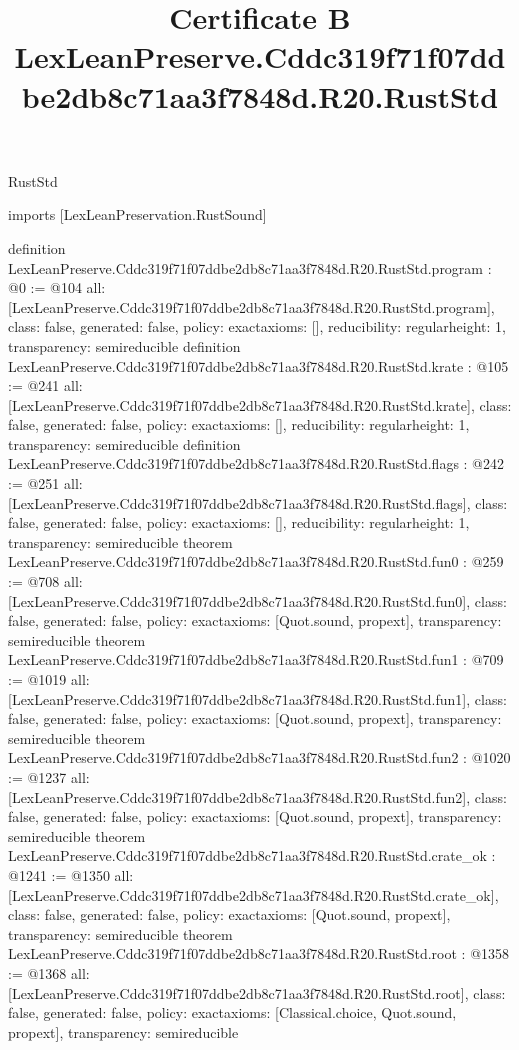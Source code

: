 \begin{lexlean}{RustStd}
\title{Certificate B LexLeanPreserve.Cddc319f71f07ddbe2db8c71aa3f7848d.R20.RustStd}
\begin{coremodule}
imports [LexLeanPreservation.RustSound]

definition LexLeanPreserve.Cddc319f71f07ddbe2db8c71aa3f7848d.R20.RustStd.program : @0 := @104 {
  all: [LexLeanPreserve.Cddc319f71f07ddbe2db8c71aa3f7848d.R20.RustStd.program],
  class: false,
  generated: false,
  policy: exact{axioms: []},
  reducibility: regular{height: 1},
  transparency: semireducible
}
definition LexLeanPreserve.Cddc319f71f07ddbe2db8c71aa3f7848d.R20.RustStd.krate : @105 := @241 {
  all: [LexLeanPreserve.Cddc319f71f07ddbe2db8c71aa3f7848d.R20.RustStd.krate],
  class: false,
  generated: false,
  policy: exact{axioms: []},
  reducibility: regular{height: 1},
  transparency: semireducible
}
definition LexLeanPreserve.Cddc319f71f07ddbe2db8c71aa3f7848d.R20.RustStd.flags : @242 := @251 {
  all: [LexLeanPreserve.Cddc319f71f07ddbe2db8c71aa3f7848d.R20.RustStd.flags],
  class: false,
  generated: false,
  policy: exact{axioms: []},
  reducibility: regular{height: 1},
  transparency: semireducible
}
theorem LexLeanPreserve.Cddc319f71f07ddbe2db8c71aa3f7848d.R20.RustStd.fun0 : @259 := @708 {
  all: [LexLeanPreserve.Cddc319f71f07ddbe2db8c71aa3f7848d.R20.RustStd.fun0],
  class: false,
  generated: false,
  policy: exact{axioms: [Quot.sound, propext]},
  transparency: semireducible
}
theorem LexLeanPreserve.Cddc319f71f07ddbe2db8c71aa3f7848d.R20.RustStd.fun1 : @709 := @1019 {
  all: [LexLeanPreserve.Cddc319f71f07ddbe2db8c71aa3f7848d.R20.RustStd.fun1],
  class: false,
  generated: false,
  policy: exact{axioms: [Quot.sound, propext]},
  transparency: semireducible
}
theorem LexLeanPreserve.Cddc319f71f07ddbe2db8c71aa3f7848d.R20.RustStd.fun2 : @1020 := @1237 {
  all: [LexLeanPreserve.Cddc319f71f07ddbe2db8c71aa3f7848d.R20.RustStd.fun2],
  class: false,
  generated: false,
  policy: exact{axioms: [Quot.sound, propext]},
  transparency: semireducible
}
theorem LexLeanPreserve.Cddc319f71f07ddbe2db8c71aa3f7848d.R20.RustStd.crate_ok : @1241 := @1350 {
  all: [LexLeanPreserve.Cddc319f71f07ddbe2db8c71aa3f7848d.R20.RustStd.crate_ok],
  class: false,
  generated: false,
  policy: exact{axioms: [Quot.sound, propext]},
  transparency: semireducible
}
theorem LexLeanPreserve.Cddc319f71f07ddbe2db8c71aa3f7848d.R20.RustStd.root : @1358 := @1368 {
  all: [LexLeanPreserve.Cddc319f71f07ddbe2db8c71aa3f7848d.R20.RustStd.root],
  class: false,
  generated: false,
  policy: exact{axioms: [Classical.choice, Quot.sound, propext]},
  transparency: semireducible
}


\end{coremodule}
\end{lexlean}
